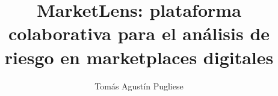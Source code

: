 \documentclass[%
    language=spanish,   %
    guias=false,         %
    pdfa=false,         %
]{usal-proyecto-final}
\title{MarketLens: plataforma colaborativa para el análisis de riesgo en marketplaces digitales}
\author{Tomás Agustín Pugliese}
\begin{document}
    \frontmatter

    \mainmatter
    
    \glsresetall %
    
    
    
    
    
    
    

    \backmatter

    \begin{appendices}
        
        
        
    \end{appendices}

    \begin{anexos}
        
    \end{anexos}

    \glosarios
\end{document}
